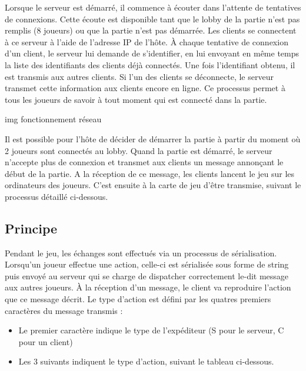 \documentclass[12pt]{report}
\begin{document}
Lorsque le serveur est démarré, il commence à écouter dans l’attente de
tentatives de connexions. Cette écoute est disponible tant que le lobby de la
partie n’est pas remplis (8 joueurs) ou que la partie n’est pas démarrée. Les
clients se connectent à ce serveur à l’aide de l’adresse IP de l’hôte. À chaque
tentative de connexion d’un client, le serveur lui demande de s’identifier, en
lui envoyant en même temps la liste des identifiants des clients déjà connectés.
Une fois l’identifiant obtenu, il est transmis aux autres clients. Si l’un des
clients se déconnecte, le serveur transmet cette information aux clients encore
en ligne. Ce processus permet à tous les joueurs de savoir à tout moment qui est
connecté dans la partie.

img fonctionnement réseau

Il est possible pour l’hôte de décider de démarrer la partie à partir du moment
où 2 joueurs sont connectés au lobby. Quand la partie est démarré, le serveur
n’accepte plus de connexion et transmet aux clients un message annonçant le
début de la partie. A la réception de ce message, les clients lancent le jeu sur
les ordinateurs des joueurs. C’est ensuite à la carte de jeu d’être transmise,
suivant le processus détaillé ci-dessous.

\subsection{Principe}

Pendant le jeu, les échanges sont effectués via un processus de sérialisation.
Lorsqu’un joueur effectue une action, celle-ci est sérialisée sous forme de
string puis envoyé au serveur qui se charge de dispatcher correctement le-dit
message aux autres joueurs. À la réception d’un message, le client va reproduire
l’action que ce message décrit. Le type d’action est défini par les quatres
premiers caractères du message transmis : 

\begin{itemize}
    \item Le premier caractère indique le type de l’expéditeur (S pour le
        serveur, C pour un client) 
    \item Les 3 suivants indiquent le type d’action, suivant le tableau
        ci-dessous.
\end{itemize}
\end{document}
